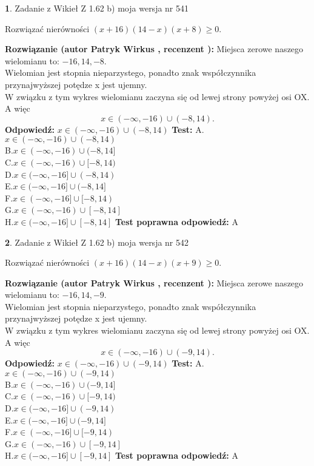 \documentclass[12pt, a4paper]{article}
\theoremstyle{definition} %
\newtheorem{zad}{}
\newcommand{\zadStart}[1]{\begin{zad}#1\newline}
\newcommand{\zadStop}{\end{zad}}
\newcommand{\rozwStart}[2]{\noindent \textbf{Rozwiązanie (autor #1 , recenzent #2): }\newline}
\newcommand{\rozwStop}{\newline}
\newcommand{\odpStart}{\noindent \textbf{Odpowiedź:}\newline}
\newcommand{\odpStop}{\newline}
\newcommand{\testStart}{\noindent \textbf{Test:}\newline}
\newcommand{\testStop}{\newline}
\newcommand{\kluczStart}{\noindent \textbf{Test poprawna odpowiedź:}\newline}
\newcommand{\kluczStop}{\newline}
\begin{document}
\zadStart{Zadanie z Wikieł Z 1.62 b) moja wersja nr 541}

Rozwiązać nierówności $(x+16)(14-x)(x+8)\ge0$.
\zadStop
\rozwStart{Patryk Wirkus}{}
Miejsca zerowe naszego wielomianu to: $-16, 14, -8$.\\
Wielomian jest stopnia nieparzystego, ponadto znak współczynnika przy\linebreak najwyższej potędze x jest ujemny.\\ W związku z tym wykres wielomianu zaczyna się od lewej strony powyżej osi OX. A więc $$x \in (-\infty,-16) \cup (-8,14).$$
\rozwStop
\odpStart
$x \in (-\infty,-16) \cup (-8,14)$
\odpStop
\testStart
A.$x \in (-\infty,-16) \cup (-8,14)$\\
B.$x \in (-\infty,-16) \cup (-8,14]$\\
C.$x \in (-\infty,-16) \cup [-8,14)$\\
D.$x \in (-\infty,-16] \cup (-8,14)$\\
E.$x \in (-\infty,-16] \cup (-8,14]$\\
F.$x \in (-\infty,-16] \cup [-8,14)$\\
G.$x \in (-\infty,-16) \cup [-8,14]$\\
H.$x \in (-\infty,-16] \cup [-8,14]$
\testStop
\kluczStart
A
\kluczStop



\zadStart{Zadanie z Wikieł Z 1.62 b) moja wersja nr 542}

Rozwiązać nierówności $(x+16)(14-x)(x+9)\ge0$.
\zadStop
\rozwStart{Patryk Wirkus}{}
Miejsca zerowe naszego wielomianu to: $-16, 14, -9$.\\
Wielomian jest stopnia nieparzystego, ponadto znak współczynnika przy\linebreak najwyższej potędze x jest ujemny.\\ W związku z tym wykres wielomianu zaczyna się od lewej strony powyżej osi OX. A więc $$x \in (-\infty,-16) \cup (-9,14).$$
\rozwStop
\odpStart
$x \in (-\infty,-16) \cup (-9,14)$
\odpStop
\testStart
A.$x \in (-\infty,-16) \cup (-9,14)$\\
B.$x \in (-\infty,-16) \cup (-9,14]$\\
C.$x \in (-\infty,-16) \cup [-9,14)$\\
D.$x \in (-\infty,-16] \cup (-9,14)$\\
E.$x \in (-\infty,-16] \cup (-9,14]$\\
F.$x \in (-\infty,-16] \cup [-9,14)$\\
G.$x \in (-\infty,-16) \cup [-9,14]$\\
H.$x \in (-\infty,-16] \cup [-9,14]$
\testStop
\kluczStart
A
\kluczStop
\end{document}
